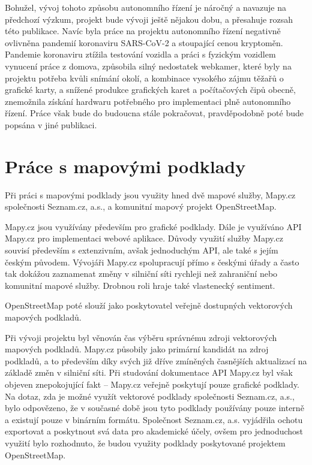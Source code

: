 \documentclass[czech, bachelor]{diploma}
\begin{document}
Bohužel, vývoj tohoto způsobu autonomního řízení je náročný a navazuje na předchozí výzkum, projekt bude vývoji ještě nějakou
dobu, a přesahuje rozsah této publikace. Navíc byla práce na projektu autonomního řízení negativně ovlivněna pandemií koronaviru
SARS-CoV-2 a stoupající cenou kryptoměn. Pandemie koronaviru ztížila testování vozidla a práci s fyzickým vozidlem vynucení práce
z domova, způsobila silný nedostatek webkamer, které byly na projektu potřeba kvůli snímání okolí, a kombinace vysokého zájmu
těžařů o grafické karty, a snížené produkce grafických karet a počítačových čipů obecně, znemožnila získání hardwaru potřebného
pro implementaci plně autonomního řízení. Práce však bude do budoucna stále pokračovat, pravděpodobně poté bude popsána v jiné
publikaci.

\chapter{Práce s mapovými podklady} \label{osm-chapter}

Při práci s mapovými podklady jsou využity hned dvě mapové služby, Mapy.cz společnosti Seznam.cz, a.s., a komunitní mapový projekt
OpenStreetMap.

Mapy.cz jsou využívány především pro grafické podklady. Dále je využíváno API Mapy.cz pro implementaci webové aplikace. Důvody
využití služby Mapy.cz souvisí především s extenzivním, avšak jednoduchým API, ale také s jejím českým původem. Vývojáři Mapy.cz
spolupracují přímo s českými úřady a často tak dokážou zaznamenat změny v silniční síti rychleji než zahraniční nebo komunitní
mapové služby. Drobnou roli hraje také vlastenecký sentiment.

OpenStreetMap poté slouží jako poskytovatel veřejně dostupných vektorových mapových podkladů.

Při vývoji projektu byl věnován čas výběru správnému zdroji vektorových mapových podkladů. Mapy.cz působily jako primární kandidát
na zdroj podkladů, a to především díky svých již dříve zmíněných časnějších aktualizací na základě změn v silniční síti.
Při studování dokumentace API Mapy.cz byl však objeven znepokojující fakt -- Mapy.cz veřejně poskytují pouze grafické podklady.
Na dotaz, zda je možné využít vektorové podklady společnosti Seznam.cz, a.s., bylo odpovězeno, že v současné době jsou tyto
podklady používány pouze interně a existují pouze v binárním formátu. Společnost Seznam.cz, a.s. vyjádřila ochotu exportovat
a poskytnout svá data pro akademické účely, ovšem pro jednoduchost využití bylo rozhodnuto, že budou využity podklady poskytované
projektem OpenStreetMap.
\end{document}
